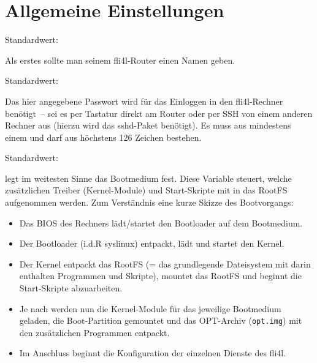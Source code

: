 \section{Allgemeine Einstellungen}

\begin{description}


  Standardwert: 

  Als erstes sollte man seinem fli4l-Router einen Namen geben.


  
  Standardwert: 
  
  Das hier angegebene Passwort wird für das Einloggen in den fli4l-Rechner
  benötigt~-- sei es per Tastatur direkt am Router oder per SSH von einem
  anderen Rechner aus (hierzu wird das sshd-Paket benötigt). Es muss aus
  mindestens einem und darf aus höchstens 126 Zeichen bestehen.



  Standardwert: 

   legt im weitesten Sinne das Bootmedium fest. Diese Variable
  steuert, welche zusätzlichen Treiber (Kernel-Module) und Start-Skripte mit in
  das RootFS aufgenommen werden. Zum Verständnis eine kurze Skizze des
  Bootvorgangs:

 \begin{itemize}
    \item Das BIOS des Rechners lädt/startet den Bootloader auf dem Bootmedium.
    \item Der Bootloader (i.d.R syslinux) entpackt, lädt und startet den
          Kernel.
    \item Der Kernel entpackt das RootFS (= das grundlegende Dateisystem mit
          darin enthalten Programmen und Skripte), mountet das RootFS und
          beginnt die Start-Skripte abzuarbeiten.
    \item Je nach  werden nun die Kernel-Module für das jeweilige
          Bootmedium geladen, die Boot-Partition gemountet und das OPT-Archiv
          (\texttt{opt.img}) mit den zusätzlichen Programmen entpackt.
    \item Im Anschluss beginnt die Konfiguration der einzelnen Dienste des fli4l.
  \end{itemize}


\end{description}

